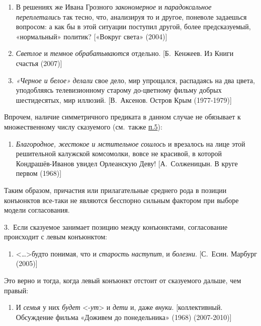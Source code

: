 \begin{enumerate}
\def\labelenumi{(\arabic{enumi})}
\setcounter{enumi}{89}
\item
  В решениях же Ивана Грозного \textit{закономерное} и
  \textit{парадоксальное} \textit{переплетались} так тесно, что, анализируя
  то и другое, поневоле задаешься вопросом: а как бы в этой ситуации
  поступил другой, более предсказуемый, «нормальный» политик? {[}«Вокруг
  света» (2004){]}
\item
  \textit{Светлое} и \textit{темн}ое \textit{обрабатываются} отдельно.
  {[}Б.~Кенжеев. Из Книги счастья (2007){]}
\item
  \textit{«Черное и белое»} \textit{делали} свое дело, мир упрощался,
  распадаясь на два цвета, уподобляясь телевизионному старому
  до-цветному фильму добрых шестидесятых, мир иллюзий. {[}В.~Аксенов.
  Остров Крым (1977-1979){]}
\end{enumerate}

Впрочем, наличие симметричного предиката в данном случае не обязывает к
множественному числу сказуемого (см.~также \underline{п.5}):

\begin{enumerate}
\def\labelenumi{(\arabic{enumi})}
\setcounter{enumi}{92}
\item
  \textit{Благородное, жестокое и мстительное} \textit{сошлось} и врезалось
  на лице этой решительной калужской комсомолки, вовсе не красивой, в
  которой Кондрашёв-Иванов увидел Орлеанскую Деву! {[}А.~Солженицын. В
  круге первом (1968){]}
\end{enumerate}

Таким образом, причастия или прилагательные среднего рода в позиции
конъюнктов все-таки не являются бесспорно сильным фактором при выборе
модели согласования.

3.~Если сказуемое занимает позицию между конъюнктами, согласование
происходит с левым конъюнктом:

\begin{enumerate}
\def\labelenumi{(\arabic{enumi})}
\setcounter{enumi}{93}
\item
  \textless\ldots\textgreater будто понимая, что и \textit{старость}
  \textit{наступит}, и \textit{болезни}. {[}С.~Есин. Марбург (2005){]}
\end{enumerate}

Это верно и тогда, когда левый конъюнкт отстоит от сказуемого дальше,
чем правый:

\begin{enumerate}
\def\labelenumi{(\arabic{enumi})}
\setcounter{enumi}{94}
\item
  И \textit{семья} у них \textit{будет} \textless*-\textit{ут}\textgreater{} и
  \textit{дети} и, даже \textit{внуки}. {[}коллективный. Обсуждение фильма
  «Доживем до понедельника» (1968) (2007-2010){]}
\end{enumerate}

